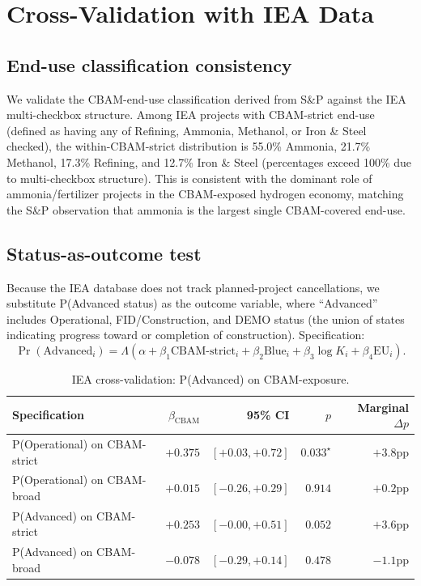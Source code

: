 \documentclass[11pt,a4paper]{article}
\begin{document}
\section{Cross-Validation with IEA Data}
\label{sec:ch8-iea-validation}

\subsection{End-use classification consistency}

We validate the CBAM-end-use classification derived from S\&P against the IEA multi-checkbox structure. Among IEA projects with CBAM-strict end-use (defined as having any of Refining, Ammonia, Methanol, or Iron \& Steel checked), the within-CBAM-strict distribution is 55.0\% Ammonia, 21.7\% Methanol, 17.3\% Refining, and 12.7\% Iron \& Steel (percentages exceed 100\% due to multi-checkbox structure). This is consistent with the dominant role of ammonia/fertilizer projects in the CBAM-exposed hydrogen economy, matching the S\&P observation that ammonia is the largest single CBAM-covered end-use.

\subsection{Status-as-outcome test}

Because the IEA database does not track planned-project cancellations, we substitute P(Advanced status) as the outcome variable, where ``Advanced'' includes Operational, FID/Construction, and DEMO status (the union of states indicating progress toward or completion of construction). Specification:
\begin{equation}
\Pr(\text{Advanced}_i) = \Lambda(\alpha + \beta_1 \text{CBAM-strict}_i + \beta_2 \text{Blue}_i + \beta_3 \log K_i + \beta_4 \text{EU}_i).
\end{equation}

\begin{table}[ht]
\centering
\caption{IEA cross-validation: P(Advanced) on CBAM-exposure.}
\label{tab:ch8-iea-replication}
\begin{tabular}{lrrrr}
\toprule
Specification & $\beta_{\text{CBAM}}$ & 95\% CI & $p$ & Marginal $\Delta p$ \\
\midrule
P(Operational) on CBAM-strict        & $+0.375$ & $[+0.03, +0.72]$ & $0.033^{\star}$ & $+3.8$pp \\
P(Operational) on CBAM-broad         & $+0.015$ & $[-0.26, +0.29]$ & $0.914$         & $+0.2$pp \\
P(Advanced) on CBAM-strict           & $+0.253$ & $[-0.00, +0.51]$ & $0.052$         & $+3.6$pp \\
P(Advanced) on CBAM-broad            & $-0.078$ & $[-0.29, +0.14]$ & $0.478$         & $-1.1$pp \\
\bottomrule
\end{tabular}
\end{table}
\end{document}
